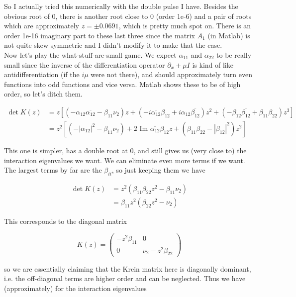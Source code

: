 \documentclass[12pt]{article}
\begin{document}
So I actually tried this numerically with the double pulse I have. Besides the obvious root of 0, there is another root close to 0 (order 1e-6) and a pair of roots which are approximately $z = \pm 0.0691$, which is pretty much spot on. There is an order 1e-16 imaginary part to these last three since the matrix $A_1$ (in Matlab) is not quite skew symmetric and I didn't modify it to make that the case.\\

Now let's play the what-stuff-are-small game. We expect $\alpha_{11}$ and $\alpha_{22}$ to be really small since the inverse of the differentiation operator $\partial_x + \mu I$ is kind of like antidifferentiation (if the $i \mu$ were not there), and should approximately turn even functions into odd functions and vice versa. Matlab shows these to be of high order, so let's ditch them.

\begin{align*}
\det K(z) 
&= z[ (-\alpha_{12} \overline{\alpha_{12}} - \beta_{11}\nu_2)z
+(- i \overline{\alpha_{12}} \beta_{12} + i \alpha_{12} \overline{\beta_{12}})z^2 + (-\beta_{12}\overline{\beta_{12}} + \beta_{11}\beta_{22})z^3] \\
&= z^2 [ (-|\alpha_{12}|^2 - \beta_{11}\nu_2)
+ 2 \text{ Im }\overline{\alpha_{12}} \beta_{12} z + (\beta_{11}\beta_{22} - |\beta_{12}|^2)z^2] 
\end{align*}

This one is simpler, has a double root at 0, and still gives us (very close to) the interaction eigenvalues we want. We can eliminate even more terms if we want. The largest terms by far are the $\beta_{ii}$, so just keeping them we have

\begin{align*}
\det K(z) 
&= z^2 ( \beta_{11}\beta_{22} z^2 -\beta_{11}\nu_2 ) \\
&= \beta_{11} z^2 ( \beta_{22} z^2 - \nu_2 ) 
\end{align*}

This corresponds to the diagonal matrix

\[
K(z) = \begin{pmatrix}
- z^2 \beta_{11} & 0 \\
0 & \nu_2  - z^2 \beta_{22}
\end{pmatrix}
\]

so we are essentially claiming that the Krein matrix here is diagonally dominant, i.e. the off-diagonal terms are higher order and can be neglected. Thus we have (approximately) for the interaction eigenvalues
\end{document}
